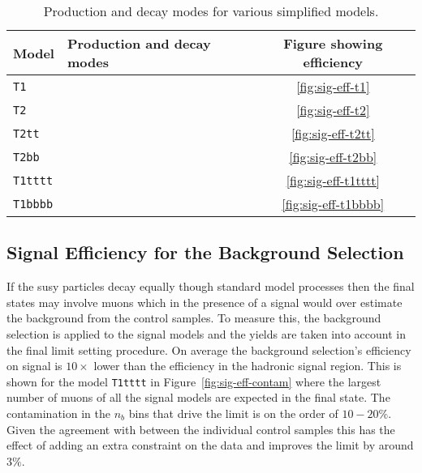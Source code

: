 \begin{table}[h!]
  \caption{Production and decay modes for various simplified models.}
  \label{tab:sms-eff}
  \centering
  \footnotesize
  \begin{tabular}{ llc }
    \hline
    Model & Production and decay modes & Figure showing efficiency \\ [0.5ex]
    \hline
    \texttt{T1} & \HepProcess{\PSgluino\PSgluino\to\Pquark\APquark\PSneutralino\Pquark\APquark\PSneutralino} & \ref{fig:sig-eff-t1} \\
    \texttt{T2} & \HepProcess{\Psquark\Psquark\to\Pquark\PSneutralino\APquark\PSneutralino} & \ref{fig:sig-eff-t2} \\
    \texttt{T2tt} & \HepProcess{\PStop\PStop\to\Ptop\PSneutralino\APtop\PSneutralino}
& \ref{fig:sig-eff-t2tt} \\
    \texttt{T2bb} & \HepProcess{\PSbottom\PSbottom\to\Pbottom\PSneutralino\APbottom\PSneutralino} & \ref{fig:sig-eff-t2bb} \\
    \texttt{T1tttt} & \HepProcess{\PSgluino\PSgluino\to\Ptop\APtop\PSneutralino\Ptop\APtop\PSneutralino} & \ref{fig:sig-eff-t1tttt} \\
    \texttt{T1bbbb} & \HepProcess{\PSgluino\PSgluino\to\Pbottom\APbottom\PSneutralino\Pbottom\APbottom\PSneutralino} & \ref{fig:sig-eff-t1bbbb} \\
    \hline
  \end{tabular}
\end{table}


\subsection{Signal Efficiency for the Background Selection} %
\label{par:signal_efficiency_for_the_background_selection}
If the \ac{susy} particles decay equally though standard model processes then the final states may involve muons which in the presence of a signal would over estimate the background from the control samples.
To measure this, the background selection is applied to the signal models and 
the yields are taken into account in the final limit setting procedure. On 
average the background selection's efficiency on signal is $10\times$ lower 
than the efficiency in the hadronic signal region. This is shown for the model 
\texttt{T1tttt} in Figure~\ref{fig:sig-eff-contam} where the largest number of muons of all the signal models are expected in the final state. The contamination in the $n_{b}$ bins that drive the limit is on the order of $10-20\%$. Given the agreement with between the individual control samples this has the effect of adding an extra constraint on the data and improves the limit by around $3\%$.

